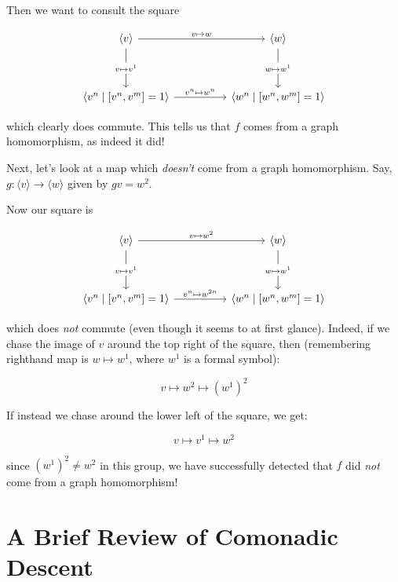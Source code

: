 \documentclass[12pt]{article}
\theoremstyle{definition}
\theoremstyle{theorem}
\begin{document}
Then we want to consult the square

\[\begin{tikzcd}
	{\langle v \rangle} && {\langle w \rangle} \\
	\\
	{\langle v^n \mid [v^n,v^m] = 1 \rangle} && {\langle w^n \mid [w^n, w^m] = 1 \rangle}
	\arrow["{v \mapsto w}", from=1-1, to=1-3]
	\arrow["{v^n \mapsto w^n}", from=3-1, to=3-3]
	\arrow["{v \mapsto v^1}"{description}, from=1-1, to=3-1]
	\arrow["{w \mapsto w^1}"{description}, from=1-3, to=3-3]
\end{tikzcd}\]

which clearly does commute. This tells us that $f$ comes from a graph homomorphism,
as indeed it did!

\bigskip

Next, let's look at a map which \emph{doesn't} come from a graph homomorphism.
Say, $g : \langle v \rangle \to \langle w \rangle$ given by $gv = w^2$.

Now our square is

\[\begin{tikzcd}
	{\langle v \rangle} && {\langle w \rangle} \\
	\\
	{\langle v^n \mid [v^n,v^m] = 1 \rangle} && {\langle w^n \mid [w^n, w^m] = 1 \rangle}
	\arrow["{v \mapsto w^2}", from=1-1, to=1-3]
	\arrow["{v^n \mapsto w^{2n}}", from=3-1, to=3-3]
	\arrow["{v \mapsto v^1}"{description}, from=1-1, to=3-1]
	\arrow["{w \mapsto w^1}"{description}, from=1-3, to=3-3]
\end{tikzcd}\]

which does \emph{not} commute (even though it seems to at first glance). 
Indeed, if we chase the image of $v$ around the top right of the square, then
(remembering righthand map is $w \mapsto w^1$, where $w^1$ is a formal symbol):

\[ v \mapsto w^2 \mapsto (w^1)^2 \]

If instead we chase around the lower left of the square, we get:

\[ v \mapsto v^1 \mapsto w^2 \]

since $(w^1)^2 \neq w^2$ in this group, we have successfully detected that 
$f$ did \emph{not} come from a graph homomorphism!

\section{A Brief Review of Comonadic Descent}
\label{review}
\end{document}
